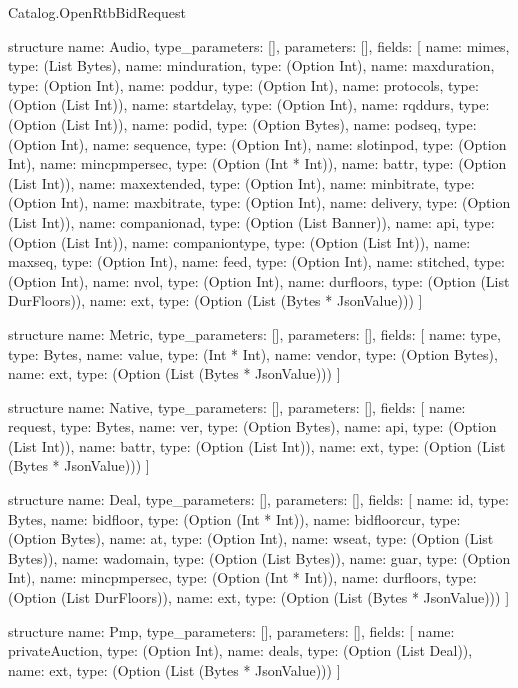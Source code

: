 \begin{lexlean}{Catalog.OpenRtbBidRequest}
\begin{semanticmodule}
structure{
  name: Audio,
  type_parameters: [],
  parameters: [],
  fields: [
    {name: mimes, type: (List Bytes)},
    {name: minduration, type: (Option Int)},
    {name: maxduration, type: (Option Int)},
    {name: poddur, type: (Option Int)},
    {name: protocols, type: (Option (List Int))},
    {name: startdelay, type: (Option Int)},
    {name: rqddurs, type: (Option (List Int))},
    {name: podid, type: (Option Bytes)},
    {name: podseq, type: (Option Int)},
    {name: sequence, type: (Option Int)},
    {name: slotinpod, type: (Option Int)},
    {name: mincpmpersec, type: (Option (Int * Int))},
    {name: battr, type: (Option (List Int))},
    {name: maxextended, type: (Option Int)},
    {name: minbitrate, type: (Option Int)},
    {name: maxbitrate, type: (Option Int)},
    {name: delivery, type: (Option (List Int))},
    {name: companionad, type: (Option (List Banner))},
    {name: api, type: (Option (List Int))},
    {name: companiontype, type: (Option (List Int))},
    {name: maxseq, type: (Option Int)},
    {name: feed, type: (Option Int)},
    {name: stitched, type: (Option Int)},
    {name: nvol, type: (Option Int)},
    {name: durfloors, type: (Option (List DurFloors))},
    {name: ext, type: (Option (List (Bytes * JsonValue)))}
  ]
}

structure{
  name: Metric,
  type_parameters: [],
  parameters: [],
  fields: [
    {name: type, type: Bytes},
    {name: value, type: (Int * Int)},
    {name: vendor, type: (Option Bytes)},
    {name: ext, type: (Option (List (Bytes * JsonValue)))}
  ]
}

structure{
  name: Native,
  type_parameters: [],
  parameters: [],
  fields: [
    {name: request, type: Bytes},
    {name: ver, type: (Option Bytes)},
    {name: api, type: (Option (List Int))},
    {name: battr, type: (Option (List Int))},
    {name: ext, type: (Option (List (Bytes * JsonValue)))}
  ]
}

structure{
  name: Deal,
  type_parameters: [],
  parameters: [],
  fields: [
    {name: id, type: Bytes},
    {name: bidfloor, type: (Option (Int * Int))},
    {name: bidfloorcur, type: (Option Bytes)},
    {name: at, type: (Option Int)},
    {name: wseat, type: (Option (List Bytes))},
    {name: wadomain, type: (Option (List Bytes))},
    {name: guar, type: (Option Int)},
    {name: mincpmpersec, type: (Option (Int * Int))},
    {name: durfloors, type: (Option (List DurFloors))},
    {name: ext, type: (Option (List (Bytes * JsonValue)))}
  ]
}

structure{
  name: Pmp,
  type_parameters: [],
  parameters: [],
  fields: [
    {name: privateAuction, type: (Option Int)},
    {name: deals, type: (Option (List Deal))},
    {name: ext, type: (Option (List (Bytes * JsonValue)))}
  ]
}


\end{semanticmodule}
\end{lexlean}
